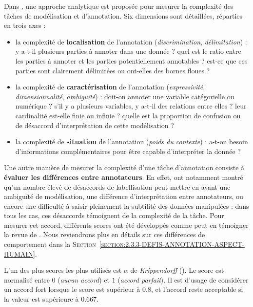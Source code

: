			Dans \cite{fort-etal:2012:modeling-complexity-manual}, une approche analytique est proposée pour mesurer la complexité des tâches de modélisation et d'annotation.
			Six dimensions sont détaillées, réparties en trois axes :
			\begin{itemize}
				\item la complexité de \textbf{localisation} de l'annotation (\textit{discrimination}, \textit{délimitation}) :
				y a-t-il plusieurs parties à annoter dans une donnée ?
				quel est le ratio entre les parties à annoter et les parties potentiellement annotables ?
				est-ce que ces parties sont clairement délimitées ou ont-elles des bornes floues ?
				\item la complexité de \textbf{caractérisation} de l'annotation (\textit{expressivité}, \textit{dimensionnalité}, \textit{ambiguïté}) :
				doit-on annoter une variable catégorielle ou numérique ?
				s'il y a plusieurs variables, y a-t-il des relations entre elles ?
				leur cardinalité est-elle finie ou infinie ?
				quelle est la proportion de confusion ou de désaccord d'interprétation de cette modélisation ?
				\item la complexité de \textbf{situation} de l'annotation (\textit{poids du contexte}) :
				a-t-on besoin d'informations complémentaires pour être capable d'interpréter la donnée ?
			\end{itemize}
			
			Une autre manière de mesurer la complexité d'une tâche d'annotation consiste à \textbf{évaluer les différences entre annotateurs}.
			En effet, \cite{gut-bayerl:2004:measuring-reliability-manual} ont notamment montré qu'un nombre élevé de désaccords de labellisation peut mettre en avant une ambiguïté de modélisation, une différence d'interprétation entre annotateurs, ou encore une difficulté à saisir pleinement la subtilité des données manipulées : dans tous les cas, ces désaccords témoignent de la complexité de la tâche.
			Pour mesurer cet accord, différents scores ont été développés comme peut en témoigner la revue de \cite{artstein-poesio:2008:intercoder-agreement-computational}.
			Nous reviendrons plus en détails sur ces différences de comportement dans la \textsc{Section~\ref{section:2.3.3-DEFIS-ANNOTATION-ASPECT-HUMAIN}}.
			\begin{leftBarInformation}
				L'un des plus scores les plus utilisés est $\alpha$ de \textit{Krippendorff} (\cite{krippendorff:2004:content-analysis-introduction}).
				Le score est normalisé entre $0$ (\textit{aucun accord}) et $1$ (\textit{accord parfait}).
				Il est d'usage de considérer un accord fort lorsque le score est supérieur à $0.8$,
				et l'accord reste acceptable si la valeur est supérieure à $0.667$.
			\end{leftBarInformation}
			
